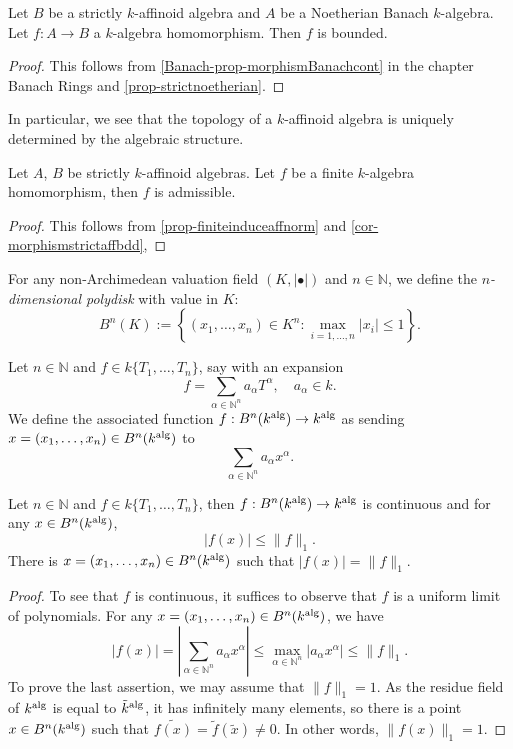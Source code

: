 \begin{corollary}\label{cor-morphismstrictaffbdd}
    Let $B$ be a strictly $k$-affinoid algebra and $A$ be a Noetherian Banach $k$-algebra. Let $f:A\rightarrow B$ a $k$-algebra homomorphism. Then $f$ is bounded.
\end{corollary}
\begin{proof}
    This follows from \cref{Banach-prop-morphismBanachcont} in the chapter Banach Rings and \cref{prop-strictnoetherian}.
\end{proof}
In particular, we see that the topology of a $k$-affinoid algebra is uniquely determined by the algebraic structure.

\begin{corollary}\label{cor-finitehomoadmi}
    Let $A$, $B$ be strictly $k$-affinoid algebras. Let $f$ be a finite $k$-algebra homomorphism, then $f$ is admissible.
\end{corollary}
\begin{proof}
    This follows from \cref{prop-finiteinduceaffnorm} and \cref{cor-morphismstrictaffbdd},
\end{proof}
\begin{definition}
    For any non-Archimedean valuation field $(K,|\bullet|)$ and $n\in \mathbb{N}$, we define the \emph{$n$-dimensional polydisk} with value in $K$:
    \[
        B^n(K):=\left\{(x_1,\ldots,x_n)\in K^n: \max_{i=1,\ldots,n}|x_i|\leq 1\right\}.
    \]
\end{definition}

\begin{definition}
    Let $n\in \mathbb{N}$ and $f\in k\{T_1,\ldots,T_n\}$, say with an expansion
    \[
        f=\sum_{\alpha \in \mathbb{N}^n} a_{\alpha}T^{\alpha},\quad a_{\alpha}\in k.  
    \]
    We define the associated function $f:B^n(k^{\mathrm{alg}})\rightarrow k^{\mathrm{alg}}$ as sending $x=(x_1,\ldots,x_n)\in B^n(k^{\mathrm{alg}})$ to 
    \[
        \sum_{\alpha \in \mathbb{N}^n} a_{\alpha}x^{\alpha}.
    \]
\end{definition}


\begin{lemma}\label{lma-finducecontfunction}
    Let $n\in \mathbb{N}$ and $f\in k\{T_1,\ldots,T_n\}$, then $f:B^n(k^{\mathrm{alg}})\rightarrow k^{\mathrm{alg}}$ is continuous and for any $x\in B^n(k^{\mathrm{alg}})$,
    \[
        |f(x)|\leq \|f\|_1.
    \]
    There is $x=(x_1,\ldots,x_n)\in B^n(k^{\mathrm{alg}})$ such that $|f(x)|=\|f\|_1$.
\end{lemma}
\begin{proof}
    To see that $f$ is continuous, it suffices to observe that $f$ is a uniform limit of polynomials. For any $x=(x_1,\ldots,x_n)\in B^n(k^{\mathrm{alg}})$, we have
    \[
        |f(x)|  =\left|\sum_{\alpha \in \mathbb{N}^n} a_{\alpha}x^{\alpha}\right|\leq \max_{\alpha \in \mathbb{N}^n} |a_{\alpha}x^{\alpha}|\leq \|f\|_1.
    \]
    To prove the last assertion, we may assume that $\|f\|_1=1$. As the residue field of $k^{\mathrm{alg}}$ is equal to $\tilde{k}^{\mathrm{alg}}$, it has infinitely many elements, so there is a point $x\in B^n(k^{\mathrm{alg}})$ such that $\widetilde{f(x)}=\tilde{f}(\tilde{x})\neq 0$. In other words, $\|f(x)\|_1=1$.
\end{proof}

